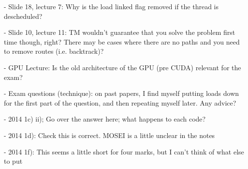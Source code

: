 - Slide 18, lecture 7: Why is the load linked flag removed if the
thread is descheduled?

- Slide 10, lecture 11: TM wouldn't guarantee that you solve the
problem first time though, right? There may be cases where there are
no paths and you need to remove routes (i.e. backtrack)?

- GPU Lecture: Is the old architecture of the GPU (pre CUDA) relevant
for the exam?

- Exam questions (technique): on past papers, I find myself putting
loads down for the first part of the question, and then repeating
myself later. Any advice?

- 2014 1c) ii); Go over the answer here; what happens to each code?

- 2014 1d): Check this is correct. MOSEI is a little unclear in the notes

- 2014 1f): This seems a little short for four marks, but I can't
think of what else to put
